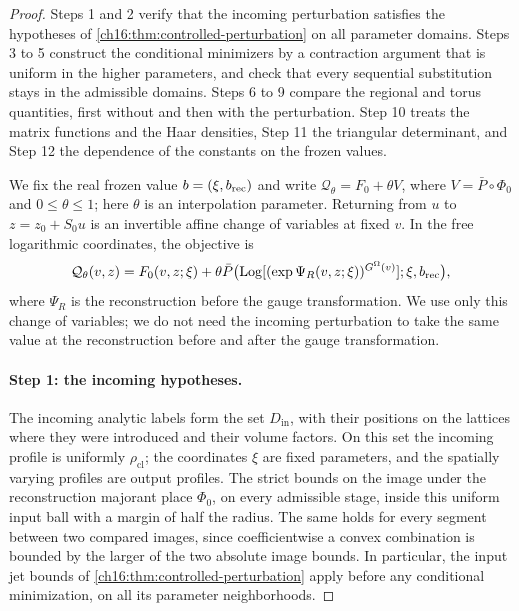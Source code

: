\begin{proof}
Steps 1 and 2 verify that the incoming perturbation satisfies the hypotheses of \cref{ch16:thm:controlled-perturbation} on all parameter domains. Steps 3 to 5 construct the conditional minimizers by a contraction argument that is uniform in the higher parameters, and check that every sequential substitution stays in the admissible domains. Steps 6 to 9 compare the regional and torus quantities, first without and then with the perturbation. Step 10 treats the matrix functions and the Haar densities, Step 11 the triangular determinant, and Step 12 the dependence of the constants on the frozen values.

We fix the real frozen value $b=(\xi,b_{\mathrm{rec}})$ and write $\mathcal Q_\theta=F_0+\theta V$, where $V=\bar P\circ\Phi_0$ and $0\le\theta\le1$; here $\theta$ is an interpolation parameter. Returning from $u$ to $z=z_0+S_0u$ is an invertible affine change of variables at fixed $v$. In the free logarithmic coordinates, the objective is
\[
 \mathcal Q_\theta(v,z)=F_0(v,z;\xi)+\theta\bar P\bigl(\operatorname{Log}[(\exp\Psi_R(v,z;\xi))^{G^\Omega(v)}];\xi,b_{\mathrm{rec}}\bigr),
\]
where $\Psi_R$ is the reconstruction before the gauge transformation. We use only this change of variables; we do not need the incoming perturbation to take the same value at the reconstruction before and after the gauge transformation.

\paragraph{Step 1: the incoming hypotheses.}
The incoming analytic labels form the set $D_{\mathrm{in}}$, with their positions on the lattices where they were introduced and their volume factors. On this set the incoming profile is uniformly $\rho_{\mathrm{cl}}$; the coordinates $\xi$ are fixed parameters, and the spatially varying profiles are output profiles. The strict bounds on the image under the reconstruction majorant place $\Phi_0$, on every admissible stage, inside this uniform input ball with a margin of half the radius. The same holds for every segment between two compared images, since coefficientwise a convex combination is bounded by the larger of the two absolute image bounds. In particular, the input jet bounds of \cref{ch16:thm:controlled-perturbation} apply before any conditional minimization, on all its parameter neighborhoods.


\end{proof}
